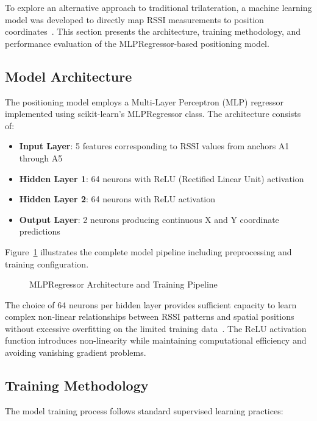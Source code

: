 To explore an alternative approach to traditional trilateration, a machine learning model was developed to directly map RSSI measurements to position coordinates~\cite{xiao2016indoor, hoang2019recurrent, wang2015indoor}. This section presents the architecture, training methodology, and performance evaluation of the MLPRegressor-based positioning model.

\subsection{Model Architecture}

The positioning model employs a Multi-Layer Perceptron (MLP) regressor implemented using scikit-learn's MLPRegressor class. The architecture consists of:

\begin{itemize}
    \item \textbf{Input Layer}: 5 features corresponding to RSSI values from anchors A1 through A5
    \item \textbf{Hidden Layer 1}: 64 neurons with ReLU (Rectified Linear Unit) activation
    \item \textbf{Hidden Layer 2}: 64 neurons with ReLU activation
    \item \textbf{Output Layer}: 2 neurons producing continuous X and Y coordinate predictions
\end{itemize}

Figure~\ref{fig:ml_architecture} illustrates the complete model pipeline including preprocessing and training configuration.

\begin{figure}[H]
\centering

\caption{MLPRegressor Architecture and Training Pipeline}
\label{fig:ml_architecture}
\end{figure}

The choice of 64 neurons per hidden layer provides sufficient capacity to learn complex non-linear relationships between RSSI patterns and spatial positions without excessive overfitting on the limited training data~\cite{chen2018wifi}. The ReLU activation function introduces non-linearity while maintaining computational efficiency and avoiding vanishing gradient problems.

\subsection{Training Methodology}

The model training process follows standard supervised learning practices:


